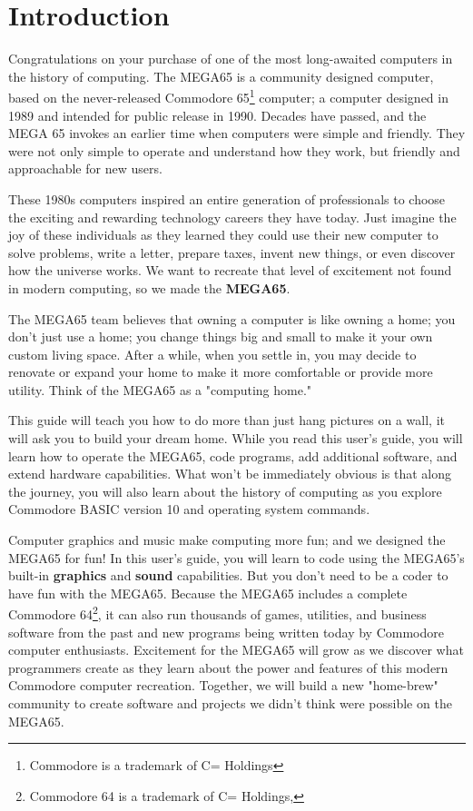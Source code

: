 \chapter{Introduction}

Congratulations on your purchase of one of the most long-awaited computers in the history of computing. The MEGA65 is a community designed computer, based on the never-released Commodore{\textregistered} 65\footnote{Commodore is a trademark of C= Holdings} computer; a computer designed in 1989 and intended for public release in 1990. Decades have passed, and the MEGA 65 invokes an earlier time when computers were simple and friendly. They were not only simple to operate and understand how they work, but friendly and approachable for new users.

These 1980s computers inspired an entire generation of professionals to choose the exciting and rewarding technology careers they have today. Just imagine the joy of these individuals as they learned they could use their new computer to solve problems, write a letter, prepare taxes, invent new things, or even discover how the universe works. We want to recreate that level of excitement not found in modern computing, so we made the {\bf MEGA65}.

The MEGA65 team believes that owning a computer is like owning a home; you don't just use a home; you change things big and small to make it your own custom living space. After a while, when you settle in, you may decide to renovate or expand your home to make it more comfortable or provide more utility. Think of the MEGA65 as a "computing home."

This guide will teach you how to do more than just hang pictures on a wall, it will ask you to build your dream home. While you read this user's guide, you will learn how to operate the MEGA65, code programs, add additional software, and extend hardware capabilities. What won't be immediately obvious is that along the journey, you will also learn about the history of computing as you explore Commodore BASIC version 10 and operating system commands.

Computer graphics and music make computing more fun; and we designed the MEGA65 for fun! In this user's guide, you will learn to code using the MEGA65's built-in {\bf graphics} and {\bf sound} capabilities. But you don't need to be a coder to have fun with the MEGA65. Because the MEGA65 includes a complete Commodore{\textregistered} 64{\texttrademark}\footnote{Commodore 64 is a trademark of C= Holdings,}, it can also run thousands of games, utilities, and business software from the past and new programs being written today by Commodore computer enthusiasts. Excitement for the MEGA65 will grow as we discover what programmers create as they learn about the power and features of this modern Commodore computer recreation. Together, we will build a new "home-brew" community to create software and projects we didn't think were possible on the MEGA65.

